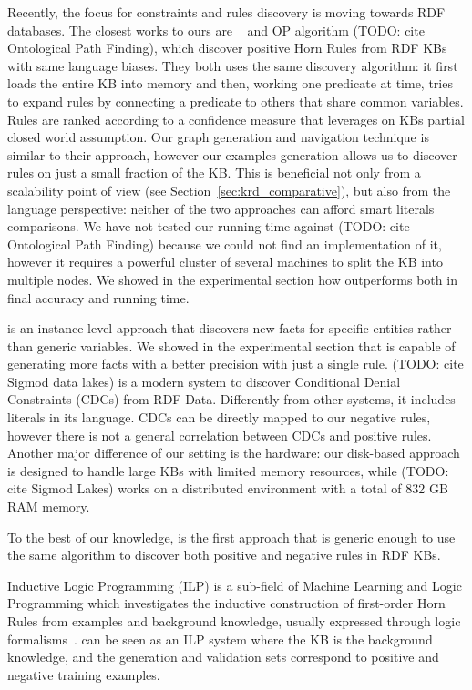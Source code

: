  Recently, the focus for constraints and rules discovery is moving towards RDF databases. The closest works to ours are \amie~\cite{galarraga2015fast} and OP algorithm (TODO: cite Ontological Path Finding), which discover positive Horn Rules from RDF KBs with same language biases. They both uses the same discovery algorithm: it first loads the entire KB into memory and then, working one predicate at time, tries to expand rules by connecting a predicate to others that share common variables. Rules are ranked according to a confidence measure that leverages on KBs partial closed world assumption. Our graph generation and navigation technique is similar to their approach, however our examples generation allows us to discover rules on just a small fraction of the KB. This is beneficial not only from a scalability point of view (see Section~\ref{sec:krd_comparative}), but also from the language perspective: neither of the two approaches can afford smart literals comparisons. We have not tested our running time against (TODO: cite Ontological Path Finding) because we could not find an implementation of it, however it requires a powerful cluster of several machines to split the KB into multiple nodes. We showed in the experimental section how \krd outperforms \amie both in final accuracy and running time.

\cite{abedjan2014amending} is an instance-level approach that discovers new facts for specific entities rather than generic variables. We showed in the experimental section that \krd is capable of generating more facts with a better precision with just a single rule. (TODO: cite Sigmod data lakes) is a modern system to discover Conditional Denial Constraints (CDCs) from RDF Data. Differently from other systems, it includes literals in its language. CDCs can be directly mapped to our negative rules, however there is not a general correlation between CDCs and positive rules. Another major difference of
our setting is the hardware: our disk-based approach is designed to handle large KBs with limited memory resources, while (TODO: cite Sigmod Lakes) works on a distributed environment with a total of 832 GB RAM memory.

To the best of our knowledge, \krd is the first approach that is generic enough to use the same algorithm to discover both positive and negative rules in RDF KBs.

Inductive Logic Programming (ILP) is a sub-field of Machine Learning and Logic Programming which investigates the inductive construction of first-order Horn Rules from examples and background knowledge, usually expressed through logic formalisms~\cite{muggleton1994inductive}. \krd can be seen as an ILP system where the KB is the background knowledge, and the generation and validation sets correspond to positive and negative training examples.

